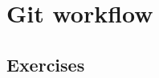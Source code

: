 \section{Git workflow}
\begin{frame}[fragile]
    \slidetitle
\end{frame}

\subsection{Exercises}
\begin{frame}[fragile]
  \subslidetitle
\end{frame}
